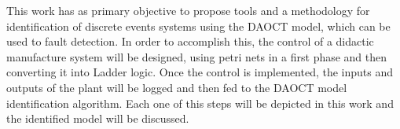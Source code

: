 \begin{foreignabstract}

This work has as primary objective to propose tools and a methodology
for identification of discrete events systems
using the \gls{DAOCT} model, which can be used to fault detection.
In order to accomplish this, the control
of a didactic manufacture system will be designed, using petri nets in
a first phase and then converting it into Ladder logic. Once the control is
implemented, the inputs and outputs of the plant will be logged and then
fed to the \gls{DAOCT} model identification
algorithm. Each one of this steps will be depicted in this work and the identified
model will be discussed.



\end{foreignabstract}

